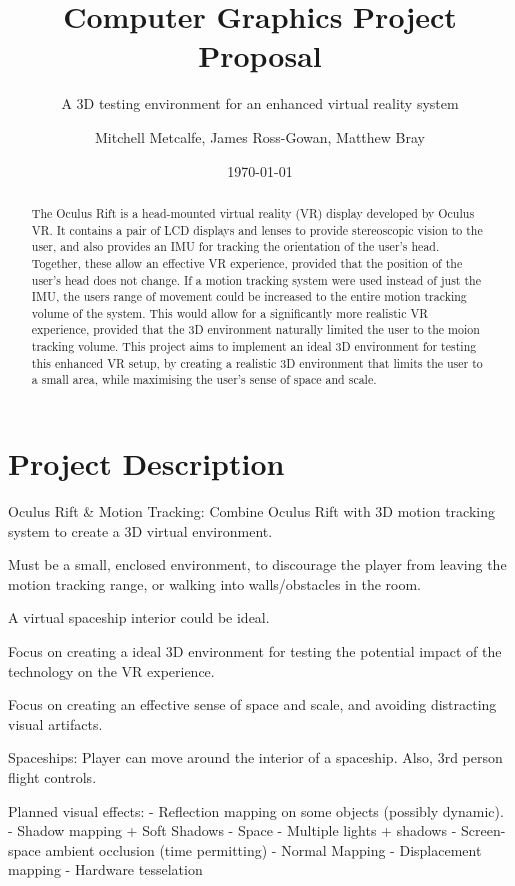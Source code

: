\documentclass[11pt]{scrartcl} %
\title{Computer Graphics Project Proposal}
\subtitle{A 3D testing environment for an enhanced virtual reality system}
\author{Mitchell Metcalfe, James Ross-Gowan, Matthew Bray }
\date{\today} %
\begin{document}
\maketitle

\begin{abstract}

The Oculus Rift is a head-mounted virtual reality (VR) display developed by
Oculus VR. It contains a pair of LCD displays and lenses to provide stereoscopic
vision to the user, and also provides an IMU for tracking the orientation of
the user's head. Together, these allow an effective VR experience, provided
that the position of the user's head does not change. If a motion tracking
system were used instead of just the IMU, the users range of movement could be
increased to the entire motion tracking volume of the system. This would allow
for a significantly more realistic VR experience, provided that the 3D
environment naturally limited the user to the moion tracking volume. This
project aims to implement an ideal 3D environment for testing this enhanced VR
setup, by creating a realistic 3D environment that limits the user to a small area, while
maximising the user's sense of space and scale.

\end{abstract}

\section*{Project Description}
Oculus Rift \& Motion Tracking:
    Combine Oculus Rift with 3D motion tracking system to create a 3D virtual
    environment.

    Must be a small, enclosed environment, to discourage the player from
    leaving the motion tracking range, or walking into walls/obstacles in the
    room.

    A virtual spaceship interior could be ideal.

    Focus on creating a ideal 3D environment for testing the potential impact
    of the technology on the VR experience.

    Focus on creating an effective sense of space and scale, and avoiding
    distracting visual artifacts.

Spaceships:
    Player can move around the interior of a spaceship.
    Also, 3rd person flight controls.

    Planned visual effects:
        - Reflection mapping on some objects (possibly dynamic).
        - Shadow mapping + Soft Shadows
        - Space
        - Multiple lights + shadows
        - Screen-space ambient occlusion (time permitting)
        - Normal Mapping
        - Displacement mapping
        - Hardware tesselation
\end{document}
